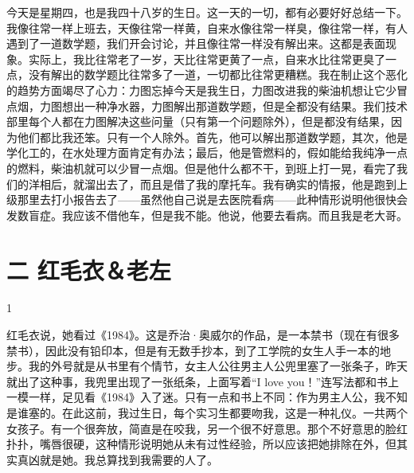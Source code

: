 今天是星期四，也是我四十八岁的生日。这一天的一切，都有必要好好总结一下。我像往常一样上班去，天像往常一样黄，自来水像往常一样臭，像往常一样，有人遇到了一道数学题，我们开会讨论，并且像往常一样没有解出来。这都是表面现象。实际上，我比往常老了一岁，天比往常更黄了一点，自来水比往常更臭了一点，没有解出的数学题比往常多了一道，一切都比往常更糟糕。我在制止这个恶化的趋势方面竭尽了心力：力图忘掉今天是我生日，力图改进我的柴油机想让它少冒点烟，力图想出一种净水器，力图解出那道数学题，但是全都没有结果。我们技术部里每个人都在力图解决这些问量（只有第一个问题除外），但是都没有结果，因为他们都比我还笨。只有一个人除外。首先，他可以解出那道数学题，其次，他是学化工的，在水处理方面肯定有办法；最后，他是管燃料的，假如能给我纯净一点的燃料，柴油机就可以少冒一点烟。但是他什么都不干，到班上打一晃，看完了我们的洋相后，就溜出去了，而且是借了我的摩托车。我有确实的情报，他是跑到上级那里去打小报告去了——虽然他自己说是去医院看病——此种情形说明他很快会发数盲症。我应该不借他车，但是我不能。他说，他要去看病。而且我是老大哥。

\section{二 红毛衣＆老左}

1 

红毛衣说，她看过《1984》。这是乔治·奥威尔的作品，是一本禁书（现在有很多禁书），因此没有铅印本，但是有无数手抄本，到了工学院的女生人手一本的地步。我的外号就是从书里有个情节，女主人公往男主人公兜里塞了一张条子，昨天就出了这种事，我兜里出现了一张纸条，上面写着“I love you！”连写法都和书上一模一样，足见看《1984》入了迷。只有一点和书上不同：作为男主人公，我不知是谁塞的。在此这前，我过生日，每个实习生都要吻我，这是一种礼仪。一共两个女孩子。有一个很奔放，简直是在咬我，另一个很不好意思。那个不好意思的脸红扑扑，嘴唇很硬，这种情形说明她从未有过性经验，所以应该把她排除在外，但其实真凶就是她。我总算找到我需要的人了。 

